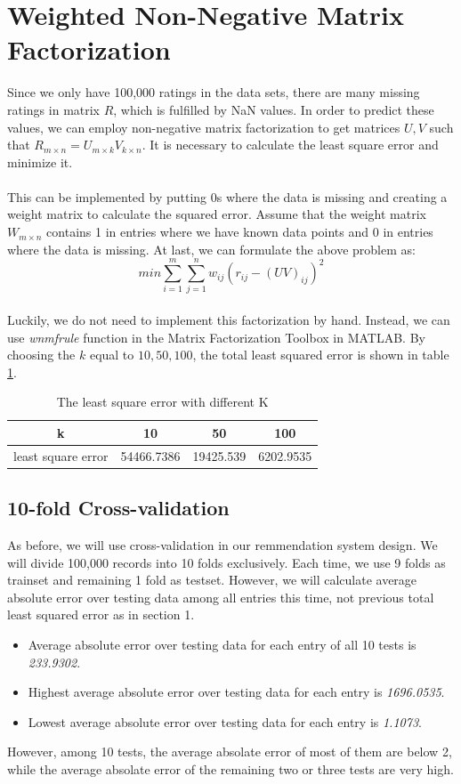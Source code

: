 \documentclass{article}
\begin{document}
\section{Weighted Non-Negative Matrix Factorization}
Since we only have 100,000 ratings in the data sets, there are many missing ratings in matrix $R$, which is fulfilled by NaN values. In order to predict these values, we can employ non-negative matrix factorization to get matrices $U, V$ such that $R_{m \times n}=U_{m \times k}V_{k \times n}$. It is necessary to calculate the least square error and minimize it.\\
\\
This can be implemented by putting 0s where the data is missing and creating a weight matrix to calculate the squared error. Assume that the weight matrix $W_{m \times n}$ contains 1 in entries where we have known data points and 0 in entries where the data is missing. At last, we can formulate the above problem as:
\begin{equation*}
min\sum_{i=1}^{m}\sum_{j=1}^{n}w_{ij}{(r_{ij}-{(UV)}_{ij})}^2
\end{equation*}
\\
Luckily, we do not need to implement this factorization by hand. Instead, we can use \emph{wnmfrule} function in the Matrix Factorization Toolbox in MATLAB. By choosing the $k$ equal to $10, 50, 100$, the total least squared error is shown in table \ref{tb:k}.
\begin{table}
\begin{center}
\caption{The least square error with different K}
\label{tb:k}
\begin{tabular}{|c|c|c|c|}
\hline
k& 10& 50 & 100\\
\hline
least square error&54466.7386&19425.539&6202.9535\\
\hline
\end{tabular}
\end{center}
\end{table}
\subsection{10-fold Cross-validation}
As before, we will use cross-validation in our remmendation system design. We will divide 100,000 records into 10 folds exclusively. Each time, we use 9 folds as trainset and remaining 1 fold as testset. However, we will calculate average absolute error over testing data among all entries this time, not previous total least squared error as in section 1.
\begin{itemize}
\item Average absolute error over testing data for each entry of all 10 tests is \emph{233.9302}.
\item Highest average absolute error over testing data for each entry is \emph{1696.0535}.
\item Lowest average absolute error over testing data for each entry is \emph{1.1073}.
\end{itemize}
However, among 10 tests, the average absolate error of most of them are below 2, while the average absolate error of the remaining two or three tests are very high.
\end{document}
